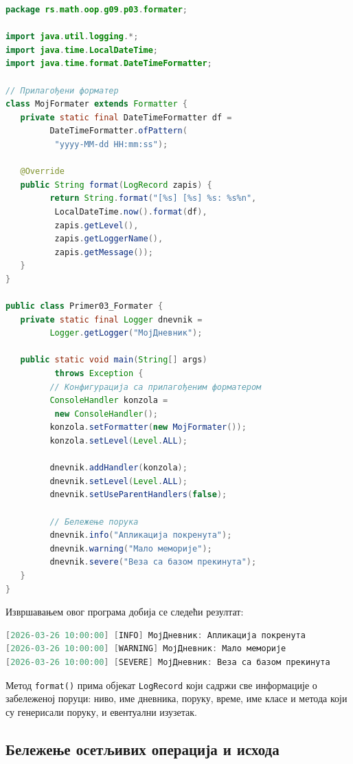 \begin{lstlisting}[language=Java]
package rs.math.oop.g09.p03.formater;
 
import java.util.logging.*;
import java.time.LocalDateTime;
import java.time.format.DateTimeFormatter;
 
// Прилагођени форматер
class MojFormater extends Formatter {
   private static final DateTimeFormatter df =
         DateTimeFormatter.ofPattern(
          "yyyy-MM-dd HH:mm:ss");
 
   @Override
   public String format(LogRecord zapis) {
         return String.format("[%s] [%s] %s: %s%n",
          LocalDateTime.now().format(df),
          zapis.getLevel(),
          zapis.getLoggerName(),
          zapis.getMessage());
   }
}
 
public class Primer03_Formater {
   private static final Logger dnevnik =
         Logger.getLogger("МојДневник");
 
   public static void main(String[] args)
          throws Exception {
         // Конфигурација са прилагођеним форматером
         ConsoleHandler konzola =
          new ConsoleHandler();
         konzola.setFormatter(new MojFormater());
         konzola.setLevel(Level.ALL);
 
         dnevnik.addHandler(konzola);
         dnevnik.setLevel(Level.ALL);
         dnevnik.setUseParentHandlers(false);
 
         // Бележење порука
         dnevnik.info("Апликација покренута");
         dnevnik.warning("Мало меморије");
         dnevnik.severe("Веза са базом прекинута");
   }
}
\end{lstlisting}


Извршавањем овог програма добија се следећи резултат:


\begin{lstlisting}[language=Java]
[2026-03-26 10:00:00] [INFO] МојДневник: Апликација покренута
[2026-03-26 10:00:00] [WARNING] МојДневник: Мало меморије
[2026-03-26 10:00:00] [SEVERE] МојДневник: Веза са базом прекинута
\end{lstlisting}


Метод \texttt{format()} прима објекат \texttt{LogRecord} који садржи све информације о забележеној поруци: ниво, име дневника, поруку, време, име класе и метода који су генерисали поруку, и евентуални изузетак.


\subsection{Бележење осетљивих операција и исхода}

